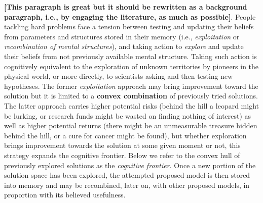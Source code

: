 {\bf [This paragraph is great but it should be rewritten as a background paragraph, i.e., by engaging the literature, as much as possible]}. People tackling hard problems face a tension between testing and updating their beliefs from parameters and structures stored in their memory (i.e., {\it exploitation} or {\it recombination of mental structures}), and taking action to {\it explore} and update their beliefs from not previously available mental structure. Taking such action is cognitively equivalent to the exploration of unknown territories by pioneers in the physical world, or more directly, to scientists asking and then testing new hypotheses. The former {\it exploitation} approach may bring improvement toward the solution but it is limited to a {\bf convex combination} of previously tried solutions. The latter approach carries higher potential risks (behind the hill a leopard might be lurking, or research funds might be wasted on finding nothing of interest) as well as higher potential returns (there might be an unmeasurable treasure hidden behind the hill, or a cure for cancer might be found), but whether exploration brings improvement towards the solution at some given moment or not, this strategy expands the cognitive frontier. Below we refer to the convex hull of previously explored solutions as the {\it cognitive frontier}.  Once a new portion of the solution space has been explored, the attempted proposed model is then stored into memory and may be recombined, later on, with other proposed models, in proportion with its believed usefulness. \\

